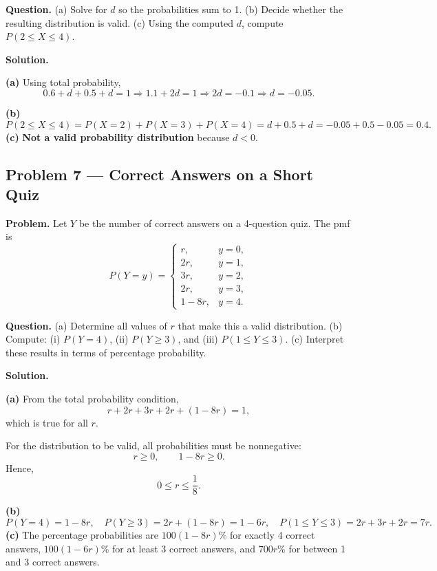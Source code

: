 \begin{ExamProblems}
		\textbf{Question.}
		(a) Solve for $d$ so the probabilities sum to 1.
		(b) Decide whether the resulting distribution is valid.
		(c) Using the computed $d$, compute $P(2\le X\le 4)$.
		
		\textbf{Solution.}

		\textbf{(a)} Using total probability,
		\[
		0.6+d+0.5+d=1\Rightarrow 1.1+2d=1\Rightarrow 2d=-0.1\Rightarrow d=-0.05.
		\]
		

		\textbf{(b)}
		\[
		P(2\le X\le 4)=P(X=2)+P(X=3)+P(X=4)=d+0.5+d=-0.05+0.5-0.05=0.4.
		\]
		\textbf{(c)} \textbf{Not a valid probability distribution} because $d<0$.

		

		\item
		\subsection*{Problem 7 — Correct Answers on a Short Quiz}
		
		\textbf{Problem.}
		Let $Y$ be the number of correct answers on a 4-question quiz. The pmf is
		\[
		P(Y=y)=\begin{cases}
			r, & y=0,\\
			2r, & y=1,\\
			3r, & y=2,\\
			2r, & y=3,\\
			1-8r, & y=4.
		\end{cases}
		\]
		
		\textbf{Question.}
		(a) Determine all values of $r$ that make this a valid distribution.
		(b) Compute: (i) $P(Y=4)$, (ii) $P(Y\ge 3)$, and (iii) $P(1\le Y\le 3)$.
		(c) Interpret these results in terms of percentage probability.
		
		\textbf{Solution.}

		\textbf{(a)} From the total probability condition,
		\[
		r+2r+3r+2r+(1-8r)=1,
		\]
		which is true for all $r$.
		
		For the distribution to be valid, all probabilities must be nonnegative:
		\[
		r\ge 0,\qquad 1-8r\ge 0.
		\]
		Hence,
		\[
		0\le r\le \frac{1}{8}.
		\]
		

		\textbf{(b)}
		\[
		P(Y=4)=1-8r,\quad
		P(Y\ge 3)=2r+(1-8r)=1-6r,\quad
		P(1\le Y\le 3)=2r+3r+2r=7r.
		\]
		\textbf{(c)} The percentage probabilities are $100(1-8r)\%$ for exactly 4 correct answers, $100(1-6r)\%$ for at least 3 correct answers, and $700r\%$ for between 1 and 3 correct answers.
		

\end{ExamProblems}
